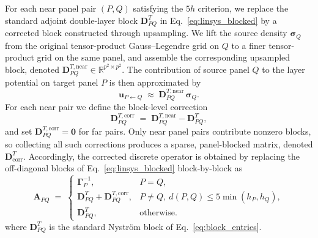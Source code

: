 \documentclass[preprint,12pt]{elsarticle}
\newcommand{\V}[1]{\boldsymbol{#1}}
\newcommand{\M}[1]{\boldsymbol{#1}}
\begin{document}
For each near panel pair $(P,Q)$ satisfying the $5h$ criterion, we replace the standard adjoint double-layer block $\M D^{T}_{PQ}$ in Eq.~\eqref{eq:linsys_blocked} by a corrected block constructed through upsampling.
We lift the source density $\V\sigma_Q$ from the original tensor-product Gauss--Legendre grid on $Q$ to a finer tensor-product grid on the same panel, and assemble the corresponding upsampled block, denoted $\M D^{T,\mathrm{near}}_{PQ}\in\mathbb{R}^{p^2\times p^2}$.
The contribution of source panel $Q$ to the layer potential on target panel $P$ is then approximated by
\begin{equation}\label{eq:nearfield_upsample}
    \V u_{P\leftarrow Q} \;\approx\; \M D^{T,\mathrm{near}}_{PQ}\,\V\sigma_Q.
\end{equation}
For each near pair we define the block-level correction
\begin{equation}\label{eq:block_correction}
    \M D^{T,\mathrm{corr}}_{PQ} \;=\; \M D^{T,\mathrm{near}}_{PQ} - \M D^{T}_{PQ},
\end{equation}
and set $\M D^{T,\mathrm{corr}}_{PQ}=\M 0$ for far pairs.
Only near panel pairs contribute nonzero blocks, so collecting all such corrections produces a sparse, panel-blocked matrix, denoted $\M D^{T}_{\mathrm{corr}}$.
Accordingly, the corrected discrete operator is obtained by replacing the off-diagonal blocks of Eq.~\eqref{eq:linsys_blocked} block-by-block as
\begin{equation}\label{eq:nearfield_corrected_A}
    \M A_{PQ} \;=\;
    \begin{cases}
        \M\Gamma^{-1}_P, & P=Q,\\[4pt]
        \M D^{T}_{PQ} + \M D^{T,\mathrm{corr}}_{PQ}, & P\neq Q,~d(P,Q) \leq 5 \min(h_P, h_Q),\\[4pt]
        \M D^{T}_{PQ}, & \text{otherwise}.
    \end{cases}
\end{equation}
where $\M D^{T}_{PQ}$ is the standard Nystr\"om block of Eq.~\eqref{eq:block_entries}.

\end{document}
